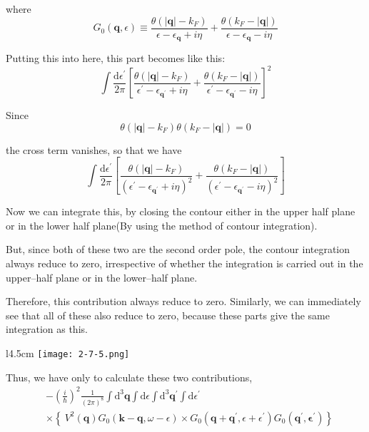 where
\[ G_0(\mathbf{q},\epsilon) \equiv \frac{\theta(|\mathbf{q}|-k_F)}{\epsilon - \epsilon_{\mathbf{q}}+i \eta} + \frac{\theta(k_F-|\mathbf{q}|)}{\epsilon - \epsilon_{\mathbf{q}}-i \eta} \]

Putting this into here, this part becomes like this:
\[ \int \frac{\mathrm{d}\epsilon^{'}}{2\pi} \left[ \frac{\theta(|\mathbf{q}|-k_F)}{\epsilon^{'} - \epsilon_{\mathbf{q}^{'}}+i \eta} + \frac{\theta(k_F-|\mathbf{q}|)}{\epsilon^{'} - \epsilon_{\mathbf{q}^{'}}-i \eta} \right]^2 \]

Since $$\theta(|\mathbf{q}|-k_F)\theta(k_F-|\mathbf{q}|) = 0$$

 the cross term vanishes, so that we have
\[ \int \frac{\mathrm{d}\epsilon^{'}}{2\pi} \left[ \frac{\theta(|\mathbf{q}|-k_F)}{\left(\epsilon^{'} - \epsilon_{\mathbf{q}^{'}}+i \eta\right)^2} + \frac{\theta(k_F-|\mathbf{q}|)}{\left(\epsilon^{'} - \epsilon_{\mathbf{q}^{'}}-i \eta\right)^2} \right] \]

Now we can integrate this, by closing the contour either in the upper half plane or in the lower half plane(By using the method of contour integration).

But, since both of these two are the second order pole, the contour integration always reduce to zero, irrespective of whether the integration is carried out in the upper--half plane or in the lower--half plane.

Therefore, this contribution always reduce to zero. Similarly, we can immediately see that all of these also reduce to zero, because these parts give the same integration as this.

\begin{wrapfigure}[8]{l}{4.5cm}
\label{Fig2.7.5} \texttt{[image: 2-7-5.png]}
\end{wrapfigure}
Thus, we have only to calculate these two contributions,
\[ \begin{split} &- \left( \frac{i}{\hbar}\right)^2 \frac{1}{\left( 2\pi \right)^8} \int \mathrm{d}^3 \mathbf{q} \int \mathrm{d}\epsilon \int \mathrm{d}^3 \mathbf{q}^{'} \int \mathrm{d} \epsilon^{'} \\
&\times \left\{ \ V^2(\mathbf{q})G_0(\mathbf{k}-\mathbf{q},\omega-\epsilon) \times G_0(\mathbf{q} + \mathbf{q}^{'}, \epsilon + \epsilon^{'}) G_0(\mathbf{q}^{'},\mathbf{\epsilon}^{'}) \right\} \end{split} \]


